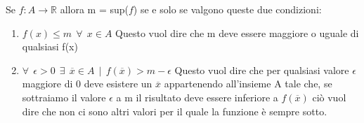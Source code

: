 \begin{observation}
    Se $f: A \longrightarrow \mathbb{R}$ allora m = sup($f$) se e solo se valgono queste due condizioni:
    \begin{enumerate}
        \item $f(x) \leq m \: \: \forall \: \: x \in A$ \hspace{.3cm} Questo vuol dire che m deve essere maggiore o uguale di qualsiasi f(x)
        \item $\forall \: \: \epsilon > 0 \: \: \exists \: \:  \overline{x} \in A \: \: | \: \: f(\overline{x}) > m - \epsilon$ \hspace{.3cm} Questo vuol dire che per qualsiasi valore $\epsilon$ maggiore di 0 deve esistere un $\overline{x}$ appartenendo all'insieme A tale che, se sottraiamo il valore $\epsilon$ a m il risultato deve essere inferiore a $f(\overline{x})$ ciò vuol dire che non ci sono altri valori per il quale la funzione è sempre sotto.
    \end{enumerate}
\end{observation}

